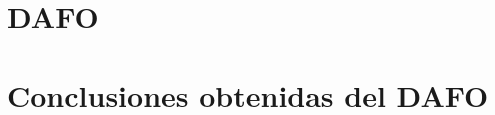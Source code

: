 \documentclass[12pt,letterpaper]{article}
\begin{document}
	\section{DAFO}
	
	\section{Conclusiones obtenidas del DAFO}
	
	
	
\end{document}
